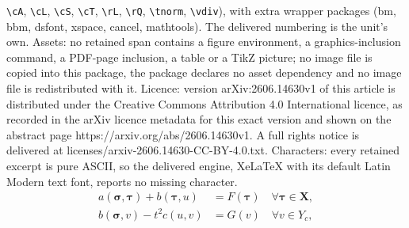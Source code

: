 \documentclass[10pt,a4paper]{amsart}
\newcommand{\bX}{\mathbf{X}}
\newcommand\bsigma{\boldsymbol{\sigma}}
\newcommand\btau{\boldsymbol{\tau}}
\begin{document}
\texttt{\textbackslash cA}, \texttt{\textbackslash cL}, \texttt{\textbackslash cS}, \texttt{\textbackslash cT}, \texttt{\textbackslash rL}, \texttt{\textbackslash rQ}, \texttt{\textbackslash tnorm}, \texttt{\textbackslash vdiv}), with extra wrapper packages (bm, bbm, dsfont, xspace, cancel, mathtools). The delivered numbering is the unit's own. Assets: no retained span contains a figure environment, a graphics-inclusion command, a PDF-page inclusion, a table or a TikZ picture; no image file is copied into this package, the package declares no asset dependency and no image file is redistributed with it. Licence: version arXiv:2606.14630v1 of this article is distributed under the Creative Commons Attribution 4.0 International licence, as recorded in the arXiv licence metadata for this exact version and shown on the abstract page https://arxiv.org/abs/2606.14630v1. A full rights notice is delivered at licenses/arxiv-2606.14630-CC-BY-4.0.txt. Characters: every retained excerpt is pure ASCII, so the delivered engine, XeLaTeX with its default Latin Modern text font, reports no missing character.
\begin{subequations}\label{eq:abstract}
    \begin{align}
    a(\bsigma,\btau) + b(\btau,u) & = F(\btau) \quad \forall \btau \in \bX, \label{eq:weak.1}\\
    b(\bsigma, v) - t^2c(u,v) & = G(v)\label{eq:weak.2} \quad \forall v\in {Y_c},
\end{align}\end{subequations}
\end{document}
